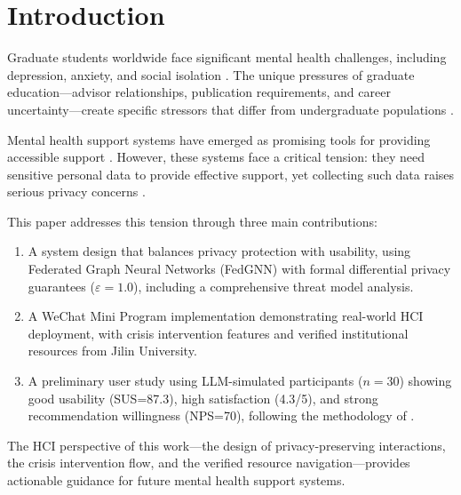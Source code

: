 \documentclass[preprint,12pt]{elsarticle}
\begin{document}
\section{Introduction}

Graduate students worldwide face significant mental health challenges, including
depression, anxiety, and social isolation \citep{gradstress2020}. The unique
pressures of graduate education—advisor relationships, publication requirements,
and career uncertainty—create specific stressors that differ from undergraduate
populations \citep{gradmental2019}.

Mental health support systems have emerged as promising tools for providing
accessible support \citep{mhapps2021}. However, these systems face a critical
tension: they need sensitive personal data to provide effective support, yet
collecting such data raises serious privacy concerns \citep{privacyhealth2020}.

This paper addresses this tension through three main contributions:

\begin{enumerate}
    \item A system design that balances privacy protection with usability, using
          Federated Graph Neural Networks (FedGNN) with formal differential privacy
          guarantees ($\varepsilon=1.0$), including a comprehensive threat model analysis.

    \item A WeChat Mini Program implementation demonstrating real-world HCI
          deployment, with crisis intervention features and verified institutional
          resources from Jilin University.

    \item A preliminary user study using LLM-simulated participants ($n=30$) showing
          good usability (SUS=87.3), high satisfaction (4.3/5), and strong
          recommendation willingness (NPS=70), following the methodology of
          \citet{horton2023llm}.
\end{enumerate}

The HCI perspective of this work—the design of privacy-preserving interactions,
the crisis intervention flow, and the verified resource navigation—provides
actionable guidance for future mental health support systems.

\end{document}
